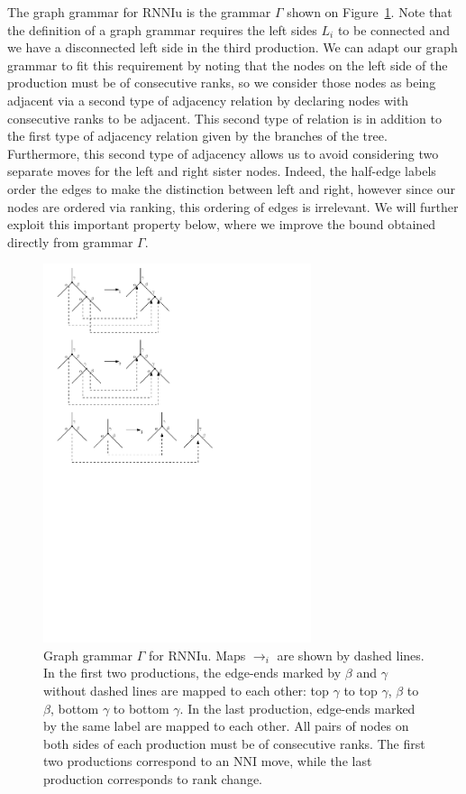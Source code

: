 \documentclass[11pt]{amsart}
\theoremstyle{definition}
\newcommand{\nni}{\mathrm{NNI}}
\newcommand{\rnniu}{\mathrm{RNNIu}}
\begin{document}
The graph grammar for $\rnniu$ is the grammar $\Gamma$ shown on Figure~\ref{grammar_rNNIu.pdf}.
Note that the definition of a graph grammar requires the left sides $L_i$ to be connected and we have a disconnected left side in the third production.
We can adapt our graph grammar to fit this requirement by noting that the nodes on the left side of the production must be of consecutive ranks, so we consider those nodes as being adjacent via a second type of adjacency relation by declaring nodes with consecutive ranks to be adjacent.
This second type of relation is in addition to the first type of adjacency relation given by the branches of the tree.
Furthermore, this second type of adjacency allows us to avoid considering two separate moves for the left and right sister nodes.
Indeed, the half-edge labels order the edges to make the distinction between left and right, however since our nodes are ordered via ranking, this ordering of edges is irrelevant.
We will further exploit this important property below, where we improve the bound obtained directly from grammar $\Gamma$.

\begin{figure}
\centering
\includegraphics[width=0.7\textwidth]{grammar_rNNIu.pdf}
\caption{Graph grammar $\Gamma$ for $\rnniu$.
Maps $\to_i$ are shown by dashed lines.
In the first two productions, the edge-ends marked by $\beta$ and $\gamma$ without dashed lines are mapped to each other: top $\gamma$ to top $\gamma$, $\beta$ to $\beta$, bottom $\gamma$ to bottom $\gamma$.
In the last production, edge-ends marked by the same label are mapped to each other.
All pairs of nodes on both sides of each production must be of consecutive ranks.
The first two productions correspond to an $\nni$ move, while the last production corresponds to rank change.}
\label{grammar_rNNIu.pdf}
\end{figure}
\end{document}
